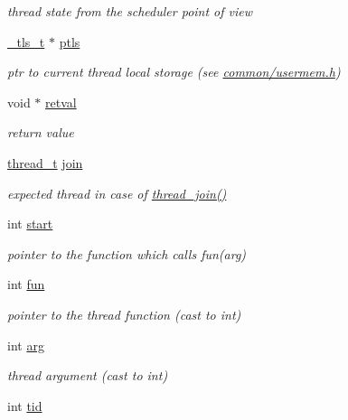 \begin{DoxyCompactItemize}
\begin{DoxyCompactList}\small\item\em thread state from the scheduler point of view \end{DoxyCompactList}\item 
\hyperlink{usermem_8h_a2694d17ea62fba3e63b915cca82721d7}{\-\_\-tls\-\_\-t} $\ast$ \hyperlink{structthread__s_a7ad218d5b7c4b6bc9c4602e6b1a89815}{ptls}
\begin{DoxyCompactList}\small\item\em ptr to current thread local storage (see \hyperlink{usermem_8h}{common/usermem.\-h}) \end{DoxyCompactList}\item 
void $\ast$ \hyperlink{structthread__s_aeefa131a48c8c3c45e6c3c0819f21cd0}{retval}
\begin{DoxyCompactList}\small\item\em return value \end{DoxyCompactList}\item 
\hyperlink{kthread_8h_a755fbb4a945decf90cb1c0eb5fd16878}{thread\-\_\-t} \hyperlink{structthread__s_a84fafe08d8ef25fc4b5a8fb1e833619c}{join}
\begin{DoxyCompactList}\small\item\em expected thread in case of \hyperlink{kthread_8c_a4e54fc344bbd735b027c03629927abb9}{thread\-\_\-join()} \end{DoxyCompactList}\item 
int \hyperlink{structthread__s_a63551d8e6d21a7370c5b3652cea282fc}{start}
\begin{DoxyCompactList}\small\item\em pointer to the function which calls fun(arg) \end{DoxyCompactList}\item 
int \hyperlink{structthread__s_a9a97385576dda275389e95ef13168cfc}{fun}
\begin{DoxyCompactList}\small\item\em pointer to the thread function (cast to int) \end{DoxyCompactList}\item 
int \hyperlink{structthread__s_a5cdab21069c6c184a86d024a0aa238aa}{arg}
\begin{DoxyCompactList}\small\item\em thread argument (cast to int) \end{DoxyCompactList}\item 
int \hyperlink{structthread__s_ad1ed1d821f595f5a7c1d68f09ba36bf5}{tid}

\end{DoxyCompactItemize}
